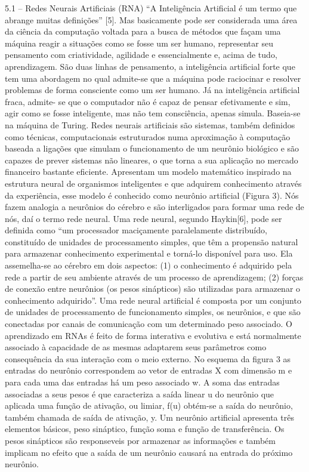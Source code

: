 \documentclass[brazil,twocolumn]{svjour3}
\begin{document}
5.1 – Redes Neurais Artificiais (RNA)
“A Inteligência Artificial é um termo que abrange muitas definições” [5]. Mas basicamente pode ser considerada uma área da ciência da computação voltada para a busca de métodos que façam uma máquina reagir a situações como se fosse um ser humano, representar seu pensamento com criatividade, agilidade e essencialmente e, acima de tudo, aprendizagem. 
São duas linhas de pensamento, a inteligência artificial forte que tem uma abordagem no qual admite-se que a máquina pode raciocinar e resolver problemas de forma consciente como um ser humano. Já na inteligência artificial fraca, admite- se que o computador não é capaz de pensar efetivamente e sim, agir como se fosse inteligente, mas não tem consciência, apenas simula. Baseia-se na máquina de Turing.
Redes neurais artificiais são sistemas, também definidos como técnicas, computacionais estruturados numa aproximação à computação baseada a ligações que simulam o funcionamento de um neurônio biológico e são capazes de prever sistemas não lineares, o que torna a sua aplicação no mercado financeiro bastante eficiente. Apresentam um modelo matemático inspirado na estrutura neural de organismos inteligentes e que adquirem conhecimento através da experiência, esse modelo é conhecido como neurônio artificial (Figura 3). Nós fazem analogia a neurônios do cérebro e são interligados para formar uma rede de nós, daí o termo rede neural.
Uma rede neural, segundo Haykin[6], pode ser definida como “um processador maciçamente paralelamente distribuído, constituído de unidades de processamento simples, que têm a propensão natural para armazenar conhecimento experimental e torná-lo disponível para uso. Ela assemelha-se ao cérebro em dois aspectos: (1) o conhecimento é adquirido pela rede a partir de seu ambiente através de um processo de aprendizagem; (2) forças de conexão entre neurônios (os pesos sinápticos) são utilizadas para armazenar o conhecimento adquirido”.
Uma rede neural artificial é composta por um conjunto de unidades de processamento de funcionamento simples, os neurônios, e que são conectadas por canais de comunicação com um determinado peso associado. O aprendizado em RNAs é feito de forma interativa e evolutiva e está normalmente associado à capacidade de as mesmas adaptarem seus parâmetros como consequência da sua interação com o meio externo.
No esquema da figura 3 as entradas do neurônio correspondem ao vetor de entradas X com dimensão m e para cada uma das entradas há um peso associado w. A soma das entradas associadas a seus pesos é que caracteriza a saída linear u do neurônio que aplicada uma função de ativação, ou limiar, f(u) obtém-se a saída do neurônio, também chamada de saída de ativação, y. 
Um neurônio artificial apresenta três elementos básicos, peso sináptico, função soma e função de transferência. Os pesos sinápticos são responseveis por armazenar as informações e também implicam no efeito que a saída de um neurônio causará na entrada do próximo neurônio.
\end{document}
